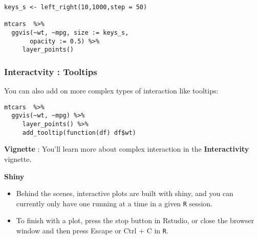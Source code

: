 \documentclass[MASTER.tex]{subfiles}
\begin{document}
\begin{frame}[fragile]
\Large
\begin{framed}
\begin{verbatim}
keys_s <- left_right(10,1000,step = 50)

mtcars  %>% 
  ggvis(~wt, ~mpg, size := keys_s, 
       opacity := 0.5) %>% 
     layer_points()

\end{verbatim}
\end{framed}

\end{frame}
\begin{frame}[fragile]
\frametitle{Interactvity : Tooltips}
You can also add on more complex types of interaction like tooltips:
\begin{framed}
	\begin{verbatim}
mtcars  %>% 
  ggvis(~wt, ~mpg) %>% 
     layer_points() %>% 
     add_tooltip(function(df) df$wt)
\end{verbatim}
\end{framed}
\textbf{Vignette} : You’ll learn more about complex interaction in the \textbf{Interactivity} vignette.
\end{frame}
\begin{frame}[fragile]
	\Large
	\textbf{Shiny}
	\begin{itemize}
		\item Behind the scenes, interactive plots are built with shiny, and you can currently only have one running at a time in a given \texttt{R} session. 
		\item To finish with a plot, press the stop button in Rstudio, or close the browser window and then press Escape or Ctrl + C in \texttt{R}.
	\end{itemize}
	
\end{frame}
\end{document}
